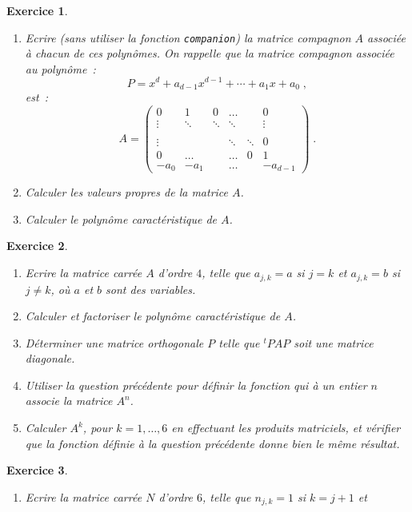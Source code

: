\documentclass{article}
\newtheorem{exo}{Exercice}[section]
\begin{document}
\begin{giacjshere}
\begin{exo}
{\begin{enumerate}
\item
Ecrire (sans utiliser la fonction \verb|companion|)
la matrice compagnon $A$ associ\'ee \`a chacun de ces polyn\^omes.
On rappelle que la matrice compagnon associ\'ee au polyn\^ome~:
$$
P=x^d+a_{d-1}x^{d-1}+\cdots+a_1x+a_0\;,
$$
est~:
\begin{equation*}
\label{compagnon}
A = 
\left(
\begin{array}{cccccc}
0&1&0&\ldots&&0\\
\vdots&\ddots&\ddots&\ddots&&\vdots\\
&&&&&\\
\vdots&&&\ddots&\ddots&0\\
0&\ldots&&\ldots&0&1\\
-a_0&-a_1&&\ldots&&-a_{d-1}
\end{array}
\right)\;.
\end{equation*} 
\item
Calculer les valeurs propres de la matrice $A$.
\item
Calculer le polyn\^ome caract\'eristique de $A$. 
\end{enumerate} 
}\end{exo}
\begin{exo}{\rm ~
\begin{enumerate}
\item
Ecrire la matrice carr\'ee $A$ d'ordre $4$, telle que $a_{j,k}=a$ si $j=k$ et
$a_{j,k}=b$ si $j \neq k$, o\`u $a$ et $b$ sont des variables. 
\item
Calculer et factoriser le polyn\^ome caract\'eristique de $A$.
\item
D\'eterminer une matrice orthogonale $P$ telle que ${^t\!P} A P$ soit
une matrice diagonale.
\item
Utiliser la question pr\'ec\'edente pour d\'efinir la fonction 
qui \`a un entier $n$ associe la matrice $A^n$.
\item
Calculer $A^k$, pour $k=1,\ldots,6$ en effectuant les produits
matriciels, et v\'erifier que la fonction d\'efinie \`a la question
pr\'ec\'edente donne bien le m\^eme r\'esultat. 
\end{enumerate} 
}\end{exo}
\begin{exo}{\rm ~
\begin{enumerate}
\item
Ecrire la matrice carr\'ee $N$ d'ordre $6$, telle que $n_{j,k}=1$ si $k=j+1$ et

\end{enumerate}}
\end{exo}
\end{giacjshere}
\end{document}
